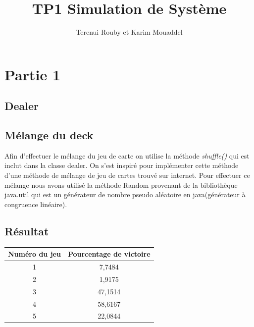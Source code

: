 \documentclass{article}
\title{TP1 Simulation de Système }
\author{Terenui Rouby et Karim Mouaddel}
\begin{document}
\maketitle
{}
\thispagestyle{empty}

\newpage
{}
\tableofcontents

\newpage
{}
\section{Partie 1}
\subsection{Dealer}
\subsection{Mélange du deck}
Afin d'effectuer le mélange du jeu de carte on utilise la méthode \textit{shuffle()} qui est inclut dans la classe dealer. On s'est inspiré pour implémenter cette méthode d'une méthode de mélange de jeu de cartes trouvé sur internet\cite{site}. Pour effectuer ce mélange nous avons utilisé la méthode Random provenant de la bibliothèque java.util qui est un générateur de nombre pseudo aléatoire en java(générateur à congruence linéaire).
\subsection{Résultat}

\vspace{0.5cm}

	\begin{flushleft}
{\renewcommand{\arraystretch}{2} %
{\setlength{\tabcolsep}{1.5cm} %
	\begin{tabular}{|c|c|}
			\hline
			Numéro du jeu & Pourcentage de victoire\\ \hline
			1 & 7,7484 \\ \hline
			2 & 1,9175 \\ \hline
			3 & 47,1514 \\ \hline
			4 & 58,6167 \\ \hline
			5 & 22,0844 \\
				\hline

		\end{tabular}}}

	\end{flushleft}
\end{document}
